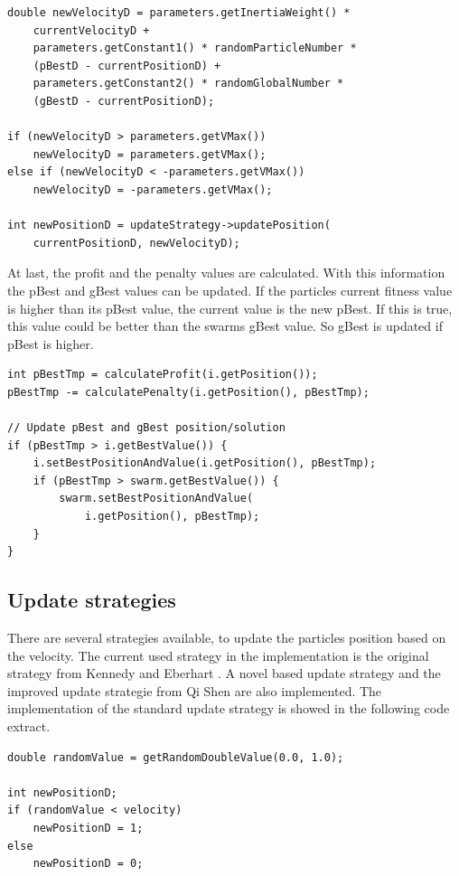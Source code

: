 \documentclass{article}
\begin{document}
\begin{lstlisting}[caption="Solver.cpp"]
double newVelocityD = parameters.getInertiaWeight() *
	currentVelocityD +
	parameters.getConstant1() * randomParticleNumber *
	(pBestD - currentPositionD) +
	parameters.getConstant2() * randomGlobalNumber *
	(gBestD - currentPositionD);

if (newVelocityD > parameters.getVMax())
    newVelocityD = parameters.getVMax();
else if (newVelocityD < -parameters.getVMax())
    newVelocityD = -parameters.getVMax();

int newPositionD = updateStrategy->updatePosition(
	currentPositionD, newVelocityD);
\end{lstlisting}

At last, the profit and the penalty values are calculated. With this information the pBest and gBest values can be updated. If the particles current fitness value is higher than its pBest value, the current value is the new pBest. If this is true, this value could be better than the swarms gBest value. So gBest is updated if pBest is higher.

\begin{lstlisting}[caption="Solver.cpp"]
int pBestTmp = calculateProfit(i.getPosition());
pBestTmp -= calculatePenalty(i.getPosition(), pBestTmp);

// Update pBest and gBest position/solution
if (pBestTmp > i.getBestValue()) {
	i.setBestPositionAndValue(i.getPosition(), pBestTmp);
	if (pBestTmp > swarm.getBestValue()) {
	    swarm.setBestPositionAndValue(
	    	i.getPosition(), pBestTmp);
	}
}
\end{lstlisting}

\subsection{Update strategies}
There are several strategies available, to update the particles position based on the velocity. The current used strategy in the implementation is the original strategy from Kennedy and Eberhart \cite{bib-discrete}. A novel based update strategy \cite{bib-novel} and the improved update strategie from Qi Shen are also implemented. The implementation of the standard update strategy is showed in the following code extract.

\begin{lstlisting}[caption="UpdateStrategy.cpp"]
double randomValue = getRandomDoubleValue(0.0, 1.0);

int newPositionD;
if (randomValue < velocity)
    newPositionD = 1;
else
    newPositionD = 0;
\end{lstlisting}
\end{document}
